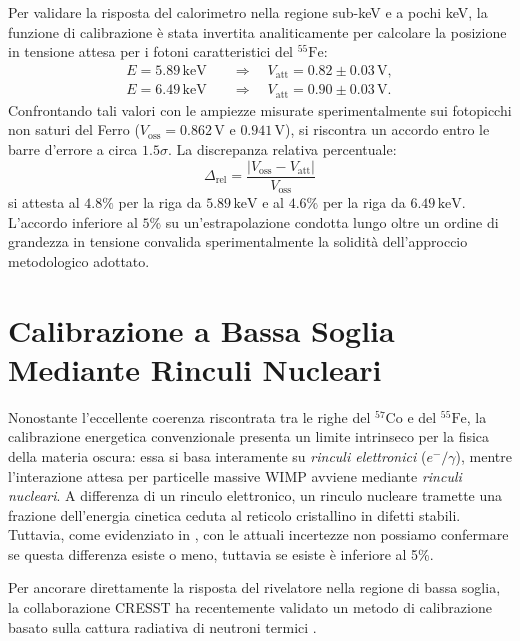 Per validare la risposta del calorimetro nella regione sub-keV e a pochi keV, la funzione di calibrazione è stata invertita analiticamente per calcolare la posizione in tensione attesa per i fotoni caratteristici del $^{55}\text{Fe}$:
\begin{align}
    E = 5.89\,\text{keV} \quad &\Longrightarrow \quad V_{\text{att}} = 0.82 \pm 0.03\,\text{V}, \\
    E = 6.49\,\text{keV} \quad &\Longrightarrow \quad V_{\text{att}} = 0.90 \pm 0.03\,\text{V}.
\end{align}
Confrontando tali valori con le ampiezze misurate sperimentalmente sui fotopicchi non saturi del Ferro ($V_{\text{oss}} = 0.862\,\text{V}$ e $0.941\,\text{V}$), si riscontra un accordo entro le barre d'errore a circa $1.5\sigma$. La discrepanza relativa percentuale:
\begin{equation}
    \Delta_{\text{rel}} = \frac{|V_{\text{oss}} - V_{\text{att}}|}{V_{\text{oss}}}
\end{equation}
si attesta al $4.8\%$ per la riga da $5.89\,\text{keV}$ e al $4.6\%$ per la riga da $6.49\,\text{keV}$. L'accordo inferiore al $5\%$ su un'estrapolazione condotta lungo oltre un ordine di grandezza in tensione convalida sperimentalmente la solidità dell'approccio metodologico adottato.

\section{Calibrazione a Bassa Soglia Mediante Rinculi Nucleari}
\label{sec:calibrazione_rinculi_nucleari}

Nonostante l'eccellente coerenza riscontrata tra le righe del $^{57}\text{Co}$ e del $^{55}\text{Fe}$, la calibrazione energetica convenzionale presenta un limite intrinseco per la fisica della materia oscura: essa si basa interamente su \textit{rinculi elettronici} ($e^-/\gamma$), mentre l'interazione attesa per particelle massive WIMP avviene mediante \textit{rinculi nucleari}. 
A differenza di un rinculo elettronico, un rinculo nucleare tramette una frazione dell'energia cinetica ceduta al reticolo cristallino in difetti stabili. Tuttavia, come evidenziato in \cite{Angloher:2023_neutron_peak}, con le attuali incertezze non possiamo confermare se questa differenza esiste o meno, tuttavia se esiste è inferiore al 5\%.

Per ancorare direttamente la risposta del rivelatore nella regione di bassa soglia, la collaborazione CRESST ha recentemente validato un metodo di calibrazione basato sulla cattura radiativa di neutroni termici \cite{Angloher:2023_neutron_peak}. 

